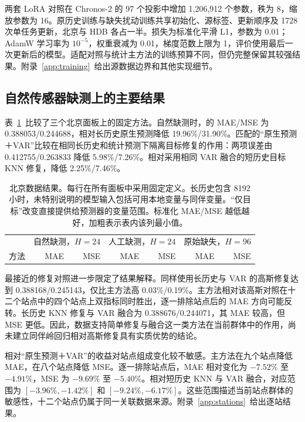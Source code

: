 两套 LoRA 对照在 Chronos-2 的 97 个投影中增加 1,206,912 个参数，秩为 8，缩放参数为 16。原历史训练与缺失扰动训练共享初始化、源标签、更新顺序及 1728 次单任务更新，北京与 HDB 各占一半。损失为标准化平滑 L1，参数为 0.01；AdamW 学习率为 $10^{-5}$，权重衰减为 0.01，梯度范数上限为 1，评价使用最后一次更新后的模型。适配对照与统计主方法的训练预算不同，但仍完整保留其较强结果。附录~\ref{app:training}~给出源数据边界和其他实现细节。

\subsection{自然传感器缺测上的主要结果}

表~\ref{tab:main}~比较了三个北京面板上的固定方法。自然缺测时，\method{}的 MAE/MSE 为 0.388053/0.244688，相对长历史原生预测降低 19.96\%/31.90\%。匹配的“原生预测＋VAR”比较在相同长历史和统计预测下隔离目标修复的作用：两项误差由 0.412755/0.263833 降低 5.98\%/7.26\%。相对采用相同 VAR 融合的短历史目标 KNN 修复，降低 2.25\%/7.46\%。

\begin{table}[t]
\caption{北京数据结果。每行在所有面板中采用固定定义。长历史包含 8192 小时，未特别说明的模型输入包括可用本地变量与同伴变量。“仅目标”改变直接提供给预测器的变量范围。标准化 MAE/MSE 越低越好，加粗表示表内该列最小值。}
\label{tab:main}
\centering\small
\setlength{\tabcolsep}{3.3pt}
\begin{tabular}{lrrrrrr}
\toprule
 & \multicolumn{2}{c}{自然缺测，$H=24$} & \multicolumn{2}{c}{人工缺测，$H=24$} & \multicolumn{2}{c}{原始缺失，$H=96$}\\
方法 & MAE & MSE & MAE & MSE & MAE & MSE\\
\midrule

\end{tabular}
\end{table}

最接近的修复对照进一步限定了结果解释。同样使用长历史与 VAR 的高斯修复达到 0.388168/0.245143，仅比主方法高 0.03\%/0.19\%。主方法相对该高斯对照在十二个站点中的四个站点上双指标同时胜出，逐一排除站点后的 MAE 方向可能反转。长历史 KNN 修复与 VAR 融合为 0.388676/0.244071，其 MAE 较高，但 MSE 更低。因此，数据支持简单修复与融合这一类方法在当前群体中的作用，尚未建立同伴岭回归相对高斯修复具有实质优势的结论。

相对“原生预测＋VAR”的收益对站点组成变化较不敏感。主方法在九个站点降低 MAE，在八个站点降低 MSE。逐一排除站点后，MAE 相对变化为 $-7.52\%$ 至 $-4.91\%$，MSE 为 $-9.69\%$ 至 $-5.40\%$。相对短历史 KNN 与 VAR 融合，对应范围为 $[-3.96\%,-1.42\%]$ 和 $[-9.24\%,-6.17\%]$。这些范围描述当前站点群体的敏感性，十二个站点仍属于同一关联数据来源。附录~\ref{app:stations}~给出逐站结果。

